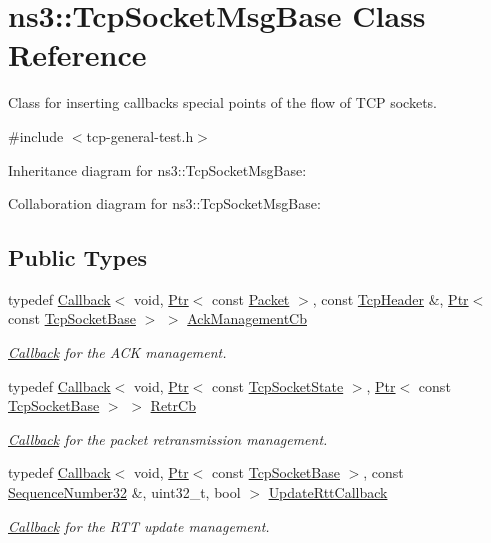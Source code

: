 \hypertarget{classns3_1_1TcpSocketMsgBase}{}\section{ns3\+:\+:Tcp\+Socket\+Msg\+Base Class Reference}
\label{classns3_1_1TcpSocketMsgBase}


Class for inserting callbacks special points of the flow of T\+CP sockets.  




{\ttfamily \#include $<$tcp-\/general-\/test.\+h$>$}



Inheritance diagram for ns3\+:\+:Tcp\+Socket\+Msg\+Base\+:


Collaboration diagram for ns3\+:\+:Tcp\+Socket\+Msg\+Base\+:
\subsection*{Public Types}
\begin{DoxyCompactItemize}
\item 
typedef \hyperlink{classns3_1_1Callback}{Callback}$<$ void, \hyperlink{classns3_1_1Ptr}{Ptr}$<$ const \hyperlink{classns3_1_1Packet}{Packet} $>$, const \hyperlink{classns3_1_1TcpHeader}{Tcp\+Header} \&, \hyperlink{classns3_1_1Ptr}{Ptr}$<$ const \hyperlink{classns3_1_1TcpSocketBase}{Tcp\+Socket\+Base} $>$ $>$ \hyperlink{classns3_1_1TcpSocketMsgBase_a266be95f5377eb857b8b6fa75fa92784}{Ack\+Management\+Cb}
\begin{DoxyCompactList}\small\item\em \hyperlink{classns3_1_1Callback}{Callback} for the A\+CK management. \end{DoxyCompactList}\item 
typedef \hyperlink{classns3_1_1Callback}{Callback}$<$ void, \hyperlink{classns3_1_1Ptr}{Ptr}$<$ const \hyperlink{classns3_1_1TcpSocketState}{Tcp\+Socket\+State} $>$, \hyperlink{classns3_1_1Ptr}{Ptr}$<$ const \hyperlink{classns3_1_1TcpSocketBase}{Tcp\+Socket\+Base} $>$ $>$ \hyperlink{classns3_1_1TcpSocketMsgBase_a2b86195d79093ed98a9dfb7ccf635e67}{Retr\+Cb}
\begin{DoxyCompactList}\small\item\em \hyperlink{classns3_1_1Callback}{Callback} for the packet retransmission management. \end{DoxyCompactList}\item 
typedef \hyperlink{classns3_1_1Callback}{Callback}$<$ void, \hyperlink{classns3_1_1Ptr}{Ptr}$<$ const \hyperlink{classns3_1_1TcpSocketBase}{Tcp\+Socket\+Base} $>$, const \hyperlink{group__network_gacb2070e4e98d2d5135c9bede58f07a03}{Sequence\+Number32} \&, uint32\+\_\+t, bool $>$ \hyperlink{classns3_1_1TcpSocketMsgBase_ab7f20ba80824e33974a46f48dd3de7b7}{Update\+Rtt\+Callback}
\begin{DoxyCompactList}\small\item\em \hyperlink{classns3_1_1Callback}{Callback} for the R\+TT update management. \end{DoxyCompactList}\end{DoxyCompactItemize}
